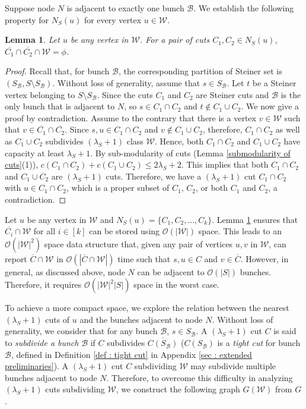 \documentclass[letterpaper,11pt]{article}
\newtheorem{lemma}{Lemma}[]
\begin{document}
Suppose node $N$ is adjacent to exactly one bunch ${\mathcal B}$.
We establish the following property for $N_S(u)$ for every vertex $u\in {\mathcal W}$. \begin{lemma} \label{lem : for a single bunch data structure}
    Let $u$ be any vertex in ${\mathcal W}$. For a pair of cuts $C_1,C_2\in N_S(u)$, $\overline{C_1}\cap \overline{C_2}\cap {\mathcal W}=\phi$. 
\end{lemma}
\begin{proof}
    Recall that, for bunch ${\mathcal B}$, the corresponding partition of Steiner set is $(S_{\mathcal B},S\setminus S_{\mathcal B})$. Without loss of generality, assume that $s\in S_{\mathcal B}$. Let $t$ be a Steiner vertex belonging to $S\setminus S_{\mathcal B}$. Since the cuts $C_1$ and $C_2$ are Steiner cuts and ${\mathcal B}$ is the only bunch that is adjacent to $N$, so $s\in C_1\cap C_2$ and $t\notin C_1\cup C_2$. We now give a proof by contradiction. Assume to the contrary that there is a vertex $v\in {\mathcal W}$ such that $v\in \overline{C_1}\cap \overline{C_2}$. Since $s,u\in C_1\cap C_2$ and $v\notin C_1\cup C_2$, therefore, $C_1\cap C_2$ as well as $C_1\cup C_2$ subdivides $(\lambda_S+1)$ class ${\mathcal W}$. Hence, both $C_1\cap C_2$ and $C_1\cup C_2$ have capacity at least $\lambda_S+1$. By sub-modularity of cuts (Lemma \ref{submodularity of cuts}(1)), $c(C_1\cap C_2)+c(C_1\cup C_2)\le 2\lambda_S+2$. This implies that both $C_1\cap C_2$ and $C_1\cup C_2$ are $(\lambda_S+1)$ cuts. Therefore, we have a $(\lambda_S+1)$ cut $C_1\cap C_2$ with $u\in C_1\cap C_2$, which is a proper subset of $C_1$, $C_2$, or both $C_1$ and $C_2$, a contradiction.
\end{proof}
Let $u$ be any vertex in ${\mathcal W}$ and $N_S(u)=\{C_1,C_2,\ldots,C_k\}$. Lemma \ref{lem : for a single bunch data structure} ensures that $\overline{C_i}\cap {\mathcal W}$ for all $i\in [k]$ can be stored using ${\mathcal O}(|{\mathcal W}|)$ space. This leads to an ${\mathcal O}(|{\mathcal W}|^2)$ space data structure that, given any pair of vertices $u,v$ in ${\mathcal W}$, can report $\overline{C}\cap {\mathcal W}$ in ${\mathcal O}(|\overline{C}\cap {\mathcal W}|)$ time such that $s,u\in C$ and $v\in \overline{C}$. However, in general, as discussed above, node $N$ can be adjacent to ${\mathcal O}(|S|)$ bunches. Therefore, it requires ${\mathcal O}(|{\mathcal W}|^2|S|)$ space in the worst case. 

To achieve a more compact space, we explore the relation between the nearest $(\lambda_S+1)$ cuts of $u$ and the bunches adjacent to node $N$. Without loss of generality, we consider that for any bunch ${\mathcal B}$, $s\in S_{\mathcal B}$. A $(\lambda_S+1)$ cut $C$ is said to \textit{subdivide a bunch} ${\mathcal B}$ if $C$ subdivides $\overline{C(S_{\mathcal B})}$ ($C(S_{\mathcal B})$ is a \textit{tight cut} for bunch ${\mathcal B}$, defined in Definition \ref{def : tight cut} in Appendix \ref{sec : extended preliminaries}).  A $(\lambda_S+1)$ cut $C$ subdividing ${\mathcal W}$ may subdivide multiple bunches adjacent to node $N$. 
Therefore, to overcome this difficulty in analyzing $(\lambda_S+1)$ cuts subdividing ${\mathcal W}$, we construct the following graph $G({\mathcal W})$ from $G$. \\
\end{document}
